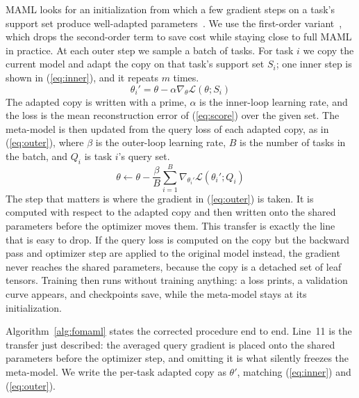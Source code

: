\documentclass[conference]{IEEEtran}
\begin{document}
MAML looks for an initialization from which a few gradient steps on a
task's support set produce well-adapted parameters~\cite{finn2017}. We use
the first-order variant~\cite{antoniou2019}, which drops the second-order
term to save cost while staying close to full MAML in practice. At each
outer step we sample a batch of tasks. For task $i$ we copy the current
model and adapt the copy on that task's support set $S_i$; one inner step is
shown in (\ref{eq:inner}), and it repeats $m$ times.
\begin{equation}
\theta_i' = \theta - \alpha \nabla_{\theta}\mathcal{L}(\theta; S_i)
\label{eq:inner}
\end{equation}
The adapted copy is written with a prime, $\alpha$ is the inner-loop
learning rate, and the loss is the mean reconstruction error of
(\ref{eq:score}) over the given set. The meta-model is then updated from the
query loss of each adapted copy, as in (\ref{eq:outer}), where $\beta$ is
the outer-loop learning rate, $B$ is the number of tasks in the batch, and
$Q_i$ is task $i$'s query set.
\begin{equation}
\theta \leftarrow \theta - \frac{\beta}{B}\sum_{i=1}^{B}
\nabla_{\theta_i'}\mathcal{L}(\theta_i'; Q_i)
\label{eq:outer}
\end{equation}
The step that matters is where the gradient in (\ref{eq:outer}) is taken. It
is computed with respect to the adapted copy and then written onto the
shared parameters before the optimizer moves them. This transfer is exactly
the line that is easy to drop. If the query loss is computed on the copy but
the backward pass and optimizer step are applied to the original model
instead, the gradient never reaches the shared parameters, because the copy
is a detached set of leaf tensors. Training then runs without training
anything: a loss prints, a validation curve appears, and checkpoints save,
while the meta-model stays at its initialization.

Algorithm~\ref{alg:fomaml} states the corrected procedure end to end.
Line~11 is the transfer just described: the averaged query gradient is
placed onto the shared parameters before the optimizer step, and omitting it
is what silently freezes the meta-model. We write the per-task adapted copy
as $\theta'$, matching (\ref{eq:inner}) and (\ref{eq:outer}).
\end{document}
